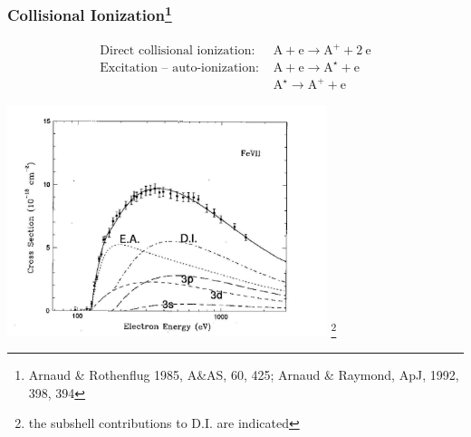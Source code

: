\begin{frame}\frametitle{Collisional Ionization\footnote{Arnaud \& Rothenflug 1985, A\&AS, 60, 425; Arnaud \& Raymond, ApJ, 1992, 398, 394}}

\begin{eqnarray}
\text{Direct collisional ionization: }  & \mathrm{A} + \mathrm{e} \rightarrow \mathrm{A^+} + 2~\mathrm{e}   \nonumber \\ 
\text{Excitation -- auto-ionization: }  & \mathrm{A} + \mathrm{e} \rightarrow \mathrm{A^\star} + \mathrm{e}   \nonumber  \\
                                         & \mathrm{A^{\star}}  \rightarrow \mathrm{A^+} + \mathrm{e}   \nonumber  
\end{eqnarray}
\vspace{0cm}
\begin{center}
  \includegraphics[width=0.7\textwidth,height=!]{./C/colion_xsec_2.jpg} \footnote{the
  subshell contributions to D.I. are indicated}
\end{center}



\end{frame}
